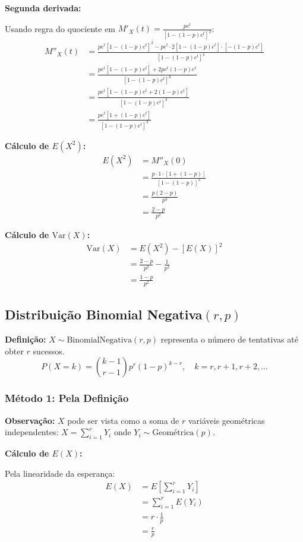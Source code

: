 \documentclass[12pt,a4paper]{article}
\theoremstyle{plain}
\theoremstyle{definition}
\theoremstyle{remark}
\begin{document}
\textbf{Segunda derivada:}

Usando regra do quociente em \(M'_X(t) = \frac{pe^t}{[1-(1-p)e^t]^2}\):
\begin{align}
M''_X(t) &= \frac{pe^t[1-(1-p)e^t]^2 - pe^t \cdot 2[1-(1-p)e^t] \cdot [-(1-p)e^t]}{[1-(1-p)e^t]^4} \\
&= \frac{pe^t[1-(1-p)e^t] + 2pe^t(1-p)e^t}{[1-(1-p)e^t]^3} \\
&= \frac{pe^t[1-(1-p)e^t + 2(1-p)e^t]}{[1-(1-p)e^t]^3} \\
&= \frac{pe^t[1 + (1-p)e^t]}{[1-(1-p)e^t]^3}
\end{align}

\textbf{Cálculo de \(E(X^2)\):}
\begin{align}
E(X^2) &= M''_X(0) \\
&= \frac{p \cdot 1 \cdot [1 + (1-p)]}{[1-(1-p)]^3} \\
&= \frac{p(2-p)}{p^3} \\
&= \frac{2-p}{p^2}
\end{align}

\textbf{Cálculo de \(\text{Var}(X)\):}
\begin{align}
\text{Var}(X) &= E(X^2) - [E(X)]^2 \\
&= \frac{2-p}{p^2} - \frac{1}{p^2} \\
&= \frac{1-p}{p^2}
\end{align}

\subsection{Distribuição Binomial Negativa\((r, p)\)}

\textbf{Definição:} \(X \sim \text{BinomialNegativa}(r, p)\) representa o número de tentativas até obter \(r\) sucessos.
\[
P(X = k) = \binom{k-1}{r-1} p^r (1-p)^{k-r}, \quad k = r, r+1, r+2, \ldots
\]

\subsubsection{Método 1: Pela Definição}

\textbf{Observação:} \(X\) pode ser vista como a soma de \(r\) variáveis geométricas independentes: \(X = \sum_{i=1}^r Y_i\) onde \(Y_i \sim \text{Geométrica}(p)\).

\textbf{Cálculo de \(E(X)\):}

Pela linearidade da esperança:
\begin{align}
E(X) &= E\left[\sum_{i=1}^r Y_i\right] \\
&= \sum_{i=1}^r E(Y_i) \\
&= r \cdot \frac{1}{p} \\
&= \frac{r}{p}
\end{align}
\end{document}
